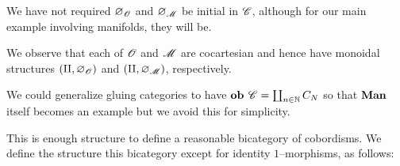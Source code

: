 \documentclass[./Thick_TQFTs_and_Quantum_Information.tex]{subfiles}
\begin{document}
\begin{rmk}
We have not required $\varnothing_{\mathscr{O}}$ and $\varnothing_{\mathscr{M}}$ be initial
in $\mathscr{C}$, although for our main example involving manifolds, they will be.
\end{rmk}

\begin{rmk}
We observe that each of $\mathscr{O}$ and $\mathscr{M}$ are cocartesian and hence have
monoidal structures $(\amalg, \varnothing_{\mathscr{O}})$ and
$(\amalg, \varnothing_{\mathscr{M}})$, respectively.
\end{rmk}

\begin{rmk}
We could generalize gluing categories to have
$\textbf{ob } \mathscr{C} = \coprod_{n \in \mathbb{N}} C_N$ so that $\textbf{Man}$ itself becomes an example
but we avoid this for simplicity.
\end{rmk}

This is enough structure to define a reasonable bicategory of cobordisms. We
define the structure this bicategory except for identity $1$--morphisms, as
follows:
\end{document}
